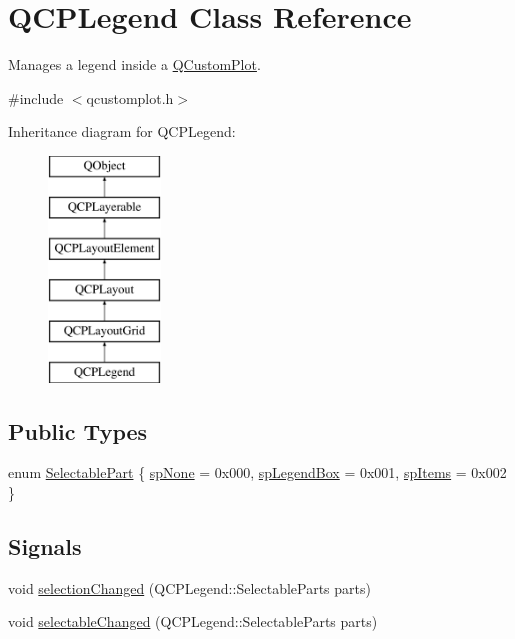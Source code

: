 \hypertarget{class_q_c_p_legend}{}\section{Q\+C\+P\+Legend Class Reference}
\label{class_q_c_p_legend}


Manages a legend inside a \mbox{\hyperlink{class_q_custom_plot}{Q\+Custom\+Plot}}.  




{\ttfamily \#include $<$qcustomplot.\+h$>$}

Inheritance diagram for Q\+C\+P\+Legend\+:\begin{figure}[H]
\begin{center}
\leavevmode
\includegraphics[height=6.000000cm]{d9/db1/class_q_c_p_legend}
\end{center}
\end{figure}
\subsection*{Public Types}
\begin{DoxyCompactItemize}
\item 
enum \mbox{\hyperlink{class_q_c_p_legend_a5404de8bc1e4a994ca4ae69e2c7072f1}{Selectable\+Part}} \{ \mbox{\hyperlink{class_q_c_p_legend_a5404de8bc1e4a994ca4ae69e2c7072f1a378201c07d500af7126e3ec91652eed7}{sp\+None}} = 0x000, 
\mbox{\hyperlink{class_q_c_p_legend_a5404de8bc1e4a994ca4ae69e2c7072f1a0fa4758962a46fa1dc9da818abae23c4}{sp\+Legend\+Box}} = 0x001, 
\mbox{\hyperlink{class_q_c_p_legend_a5404de8bc1e4a994ca4ae69e2c7072f1a768bfb95f323db4c66473375032c0af7}{sp\+Items}} = 0x002
 \}
\end{DoxyCompactItemize}
\subsection*{Signals}
\begin{DoxyCompactItemize}
\item 
void \mbox{\hyperlink{class_q_c_p_legend_a82c88464edac07a9eefaf3906268df3b}{selection\+Changed}} (Q\+C\+P\+Legend\+::\+Selectable\+Parts parts)
\item 
void \mbox{\hyperlink{class_q_c_p_legend_a8a77300fd0976d6bdd8000f4e8d114b8}{selectable\+Changed}} (Q\+C\+P\+Legend\+::\+Selectable\+Parts parts)
\end{DoxyCompactItemize}
